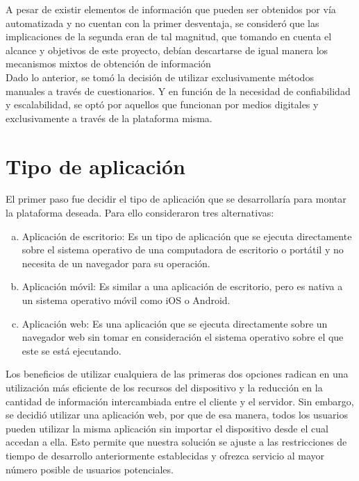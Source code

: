 			A pesar de existir elementos de información que pueden ser obtenidos por vía automatizada y no cuentan con la primer desventaja, se consideró que las implicaciones de la segunda eran de tal magnitud, que tomando en cuenta el alcance y objetivos de este proyecto, debían descartarse de igual manera los mecanismos mixtos de obtención de información \\

			Dado lo anterior, se tomó la decisión de utilizar exclusivamente métodos manuales a través de cuestionarios. Y en función de la necesidad de confiabilidad y escalabilidad, se optó por aquellos que funcionan por medios digitales y exclusivamente a través de la plataforma misma.

	\section{Tipo de aplicación}
		El primer paso fue decidir el tipo de aplicación que se desarrollaría para montar la plataforma deseada. Para ello consideraron tres alternativas:
		\begin{enumerate}[(a)] 	
		    \item Aplicación de escritorio:
		    	Es un tipo de aplicación que se ejecuta directamente sobre el sistema operativo de una computadora de escritorio o portátil y no necesita de un navegador para su operación.
		    \item Aplicación móvil:
		    	Es similar a una aplicación de escritorio, pero es nativa a un sistema operativo móvil como iOS o Android. 
		    \item Aplicación web:
		    	Es una aplicación que se ejecuta directamente sobre un navegador web sin tomar en consideración el sistema operativo sobre el que este se está ejecutando.
		\end{enumerate}
		Los beneficios de utilizar cualquiera de las primeras dos opciones radican en una utilización más eficiente de los recursos del dispositivo y la reducción en la cantidad de información intercambiada entre el cliente y el servidor. Sin embargo, se decidió utilizar una aplicación web, por que de esa manera, todos los usuarios pueden utilizar la misma aplicación sin importar el dispositivo desde el cual accedan a ella. Esto permite que nuestra solución se ajuste a las restricciones de tiempo de desarrollo anteriormente establecidas y ofrezca servicio al mayor número posible de usuarios potenciales. 

